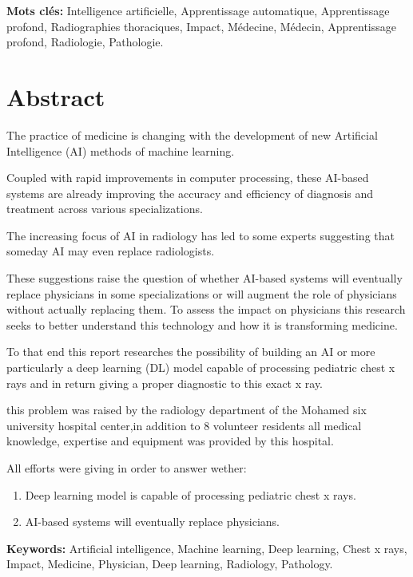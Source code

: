 \documentclass[12pt]{report}
\begin{document}
    \vspace*{2cm}
    \textbf{Mots clés:} Intelligence artificielle, Apprentissage automatique, Apprentissage profond, Radiographies thoraciques, Impact, Médecine, Médecin, Apprentissage profond, Radiologie, Pathologie.

    \chapter*{Abstract}
    The practice of medicine is changing with the development of new Artificial Intelligence (AI) methods of machine learning. 
    
    Coupled with rapid improvements in computer processing, these AI-based systems are already improving the accuracy and efficiency of diagnosis and treatment across various specializations. 
    
    The increasing focus of AI in radiology has led to some experts suggesting that someday AI may even replace radiologists. 
    
    These suggestions raise the question of whether AI-based systems will eventually replace physicians in some specializations or will augment the role of physicians without actually replacing them. To assess the impact on physicians this research seeks to better understand this technology and how it is transforming medicine. 
    
    To that end this report researches the possibility of building an AI or more particularly a deep learning (DL) model capable of processing pediatric chest x rays and in return giving a proper diagnostic to this exact x ray.

    this problem was raised by the radiology department of the Mohamed six university hospital center,in addition to 8 volunteer residents all medical knowledge, expertise and equipment was provided by this hospital.

    All efforts were giving in order to answer wether:

    \begin{enumerate}
        \item Deep learning model is capable of processing pediatric chest x rays.
        \item AI-based systems will eventually replace physicians.
    \end{enumerate}


    \vspace*{2cm}
    \textbf{Keywords:} Artificial intelligence, Machine learning, Deep learning, Chest x rays, Impact, Medicine, Physician, Deep learning, Radiology, Pathology.
\end{document}
